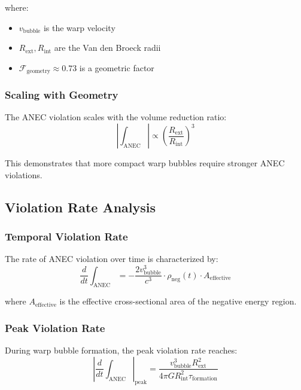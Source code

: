 where:
\begin{itemize}
\item $v_{\text{bubble}}$ is the warp velocity
\item $R_{\text{ext}}, R_{\text{int}}$ are the Van den Broeck radii
\item $\mathcal{F}_{\text{geometry}} \approx 0.73$ is a geometric factor
\end{itemize}

\subsubsection{Scaling with Geometry}

The ANEC violation scales with the volume reduction ratio:
\begin{equation}
|\int_{\text{ANEC}}| \propto \left(\frac{R_{\text{ext}}}{R_{\text{int}}}\right)^3
\end{equation}

This demonstrates that more compact warp bubbles require stronger ANEC violations.

\subsection{Violation Rate Analysis}

\subsubsection{Temporal Violation Rate}

The rate of ANEC violation over time is characterized by:
\begin{equation}
\frac{d}{dt}\int_{\text{ANEC}} = -\frac{2v_{\text{bubble}}^3}{c^3} \cdot \rho_{\text{neg}}(t) \cdot A_{\text{effective}}
\end{equation}

where $A_{\text{effective}}$ is the effective cross-sectional area of the negative energy region.

\subsubsection{Peak Violation Rate}

During warp bubble formation, the peak violation rate reaches:
\begin{equation}
\left|\frac{d}{dt}\int_{\text{ANEC}}\right|_{\text{peak}} = \frac{v_{\text{bubble}}^3 R_{\text{ext}}^2}{4\pi G R_{\text{int}}^2 \tau_{\text{formation}}}
\end{equation}

